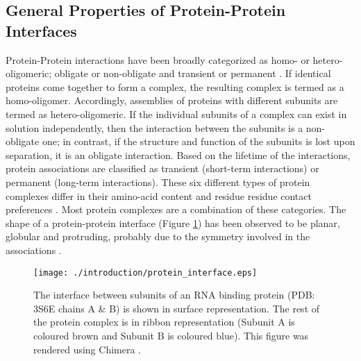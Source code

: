 \subsection{General Properties of Protein-Protein Interfaces}
\label{interface_prop}
\par
Protein-Protein interactions have been broadly categorized as homo- or hetero-oligomeric; obligate or non-obligate and transient or permanent \citep{Nooren2003}. If  identical proteins come together to form a complex, the resulting complex is termed as a homo-oligomer. Accordingly, assemblies of proteins with different subunits are termed as hetero-oligomeric. If the individual subunits of a complex can exist in solution independently, then the interaction between the subunits is a non-obligate one; in contrast, if the structure and function of the subunits is lost upon separation, it is an obligate interaction. Based on the lifetime of the interactions, protein associations are classified as transient (short-term interactions) or permanent (long-term interactions). These six different types of protein complexes differ in their amino-acid content and residue residue contact preferences \citep{Ofran2003}. Most protein complexes are a combination of these categories. The shape of a protein-protein interface (Figure \ref{interface}) has been observed to be planar, globular and protruding, probably due to the symmetry involved in the associations \citep{Argos1988, Jones1996}. 

\begin{figure}[t!]
	\centering
	\texttt{[image: ./introduction/protein\_interface.eps]}
	\vspace{-10pt}
	\caption[Protein Interface]{The interface between subunits of an RNA binding protein (PDB: 3S6E chains A \& B) is shown in surface representation. The rest of the protein complex is in ribbon representation (Subunit A is coloured brown and Subunit B is coloured blue). This figure was rendered using Chimera \citep{Pettersen2004}.}
	\label{interface}
	\vspace{-12pt}
\end{figure}

